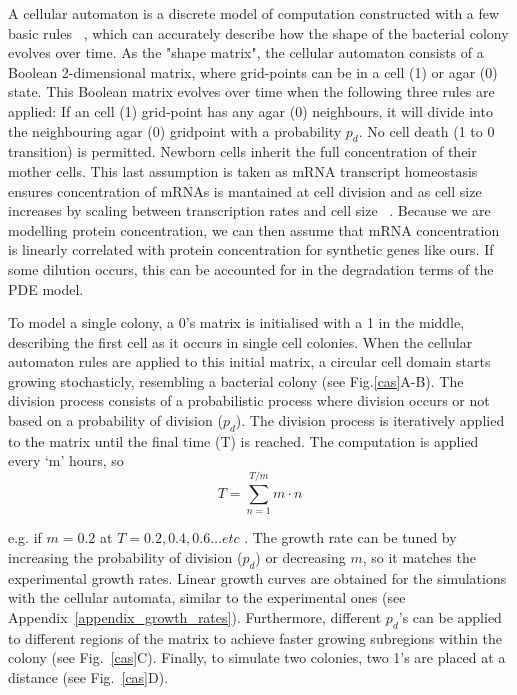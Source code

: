 A cellular automaton is a discrete model of computation constructed with a few basic rules ~\parencite{gardner1970mathematical}, which can accurately describe how the shape of the bacterial colony evolves over time.
As the "shape matrix", the cellular automaton consists of a Boolean 2-dimensional matrix, where grid-points can be in a cell (1) or agar (0) state.
This Boolean matrix evolves over time when the following three rules are applied: If an cell (1) grid-point has any agar (0) neighbours, it will divide into the neighbouring agar (0) gridpoint with a probability $p_{d}$.
No cell death (1 to 0 transition) is permitted.
Newborn cells inherit the full concentration of their mother cells.
This last assumption is taken as mRNA transcript homeostasis ensures concentration of mRNAs is mantained at cell division and as cell size increases by scaling between transcription rates and cell size ~\parencite{berry2022mechanisms,volteras2023global}.
Because we are modelling protein concentration, we can then assume that mRNA concentration is linearly correlated with protein concentration for synthetic genes like ours.
If some dilution occurs, this can be accounted for in the degradation terms of the PDE model.

To model a single colony, a 0's matrix is initialised with a 1 in the middle, describing the first cell as it occurs in single cell colonies.
When the cellular automaton rules are applied to this initial matrix, a circular cell domain starts growing stochasticly, resembling a bacterial colony (see Fig.\ref{cas}A-B).
The division process consists of a probabilistic process where division occurs or not based on a probability of division ($p_{d}$).
The division process is iteratively applied to the matrix until the final time (T) is reached.
The computation is applied every ‘m’ hours, so
\begin{equation}
        T = \sum_{n=1}^{T/m} m\cdot n
\end{equation}

e.g. if $m=0.2$ at $T=0.2, 0.4, 0.6 \ldots etc$ .
The growth rate can be tuned by increasing the probability of division ($p_d$) or decreasing $m$, so it matches the experimental growth rates.
Linear growth curves are obtained for the simulations with the cellular automata, similar to the experimental ones (see Appendix~\ref{appendix_growth_rates}).
Furthermore, different $p_d$’s can be applied to different regions of the matrix to achieve faster growing subregions within the colony (see Fig.~\ref{cas}C).
Finally, to simulate two colonies, two 1’s are placed at a distance (see Fig.~\ref{cas}D).


